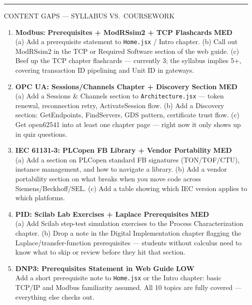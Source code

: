 \documentclass[10pt]{article}
\newcommand{\med}{\textcolor{samber}{\small\bfseries MED}}
\newcommand{\low}{\textcolor{sgreen}{\small\bfseries LOW}}
\begin{document}
\smallskip
{\color{snavy}\rule{\linewidth}{0.4pt}}
\smallskip

{\small\sffamily\color{sgray}\MakeUppercase{Content Gaps — Syllabus vs.\ Coursework}}
\smallskip

\begin{enumerate}[resume]\small
  \item \textbf{Modbus: Prerequisites + ModRSsim2 + TCP Flashcards} \hfill \med \\
    (a) Add a prerequisite statement to \texttt{Home.jsx} / Intro chapter. (b) Call out ModRSsim2 in the TCP or Required Software section of the web guide. (c) Beef up the TCP chapter flashcards — currently 3; the syllabus implies 5+, covering transaction ID pipelining and Unit ID in gateways.

  \item \textbf{OPC UA: Sessions/Channels Chapter + Discovery Section} \hfill \med \\
    (a) Add a Sessions \& Channels section to \texttt{Architecture.jsx} — token renewal, reconnection retry, ActivateSession flow. (b) Add a Discovery section: GetEndpoints, FindServers, GDS pattern, certificate trust flow. (c) Get open62541 into at least one chapter page — right now it only shows up in quiz questions.

  \item \textbf{IEC 61131-3: PLCopen FB Library + Vendor Portability} \hfill \med \\
    (a) Add a section on PLCopen standard FB signatures (TON/TOF/CTU), instance management, and how to navigate a library. (b) Add a vendor portability section on what breaks when you move code across Siemens/Beckhoff/SEL. (c) Add a table showing which IEC version applies to which platforms.

  \item \textbf{PID: Scilab Lab Exercises + Laplace Prerequisites} \hfill \med \\
    (a) Add Scilab step-test simulation exercises to the Process Characterization chapter. (b) Drop a note in the Digital Implementation chapter flagging the Laplace/transfer-function prerequisites — students without calculus need to know what to skip or review before they hit that section.

  \item \textbf{DNP3: Prerequisites Statement in Web Guide} \hfill \low \\
    Add a short prerequisite note to \texttt{Home.jsx} or the Intro chapter: basic TCP/IP and Modbus familiarity assumed. All 10 topics are fully covered — everything else checks out.


\end{enumerate}
\end{document}
